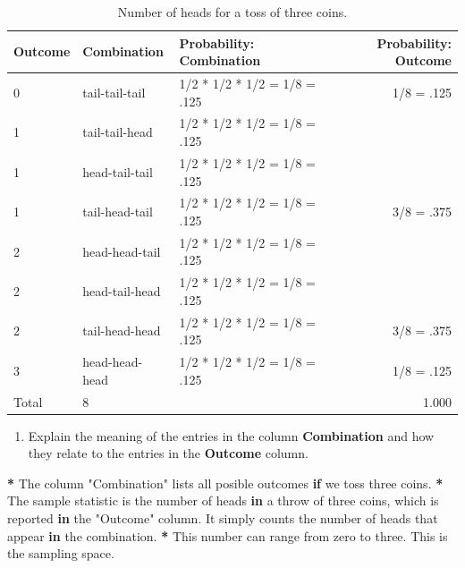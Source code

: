 \documentclass[a4paper]{book}
\newenvironment{Shaded}{\begin{snugshade}}{\end{snugshade}}
\newcommand{\StringTok}[1]{\textcolor[rgb]{0.00,0.00,0.00}{#1}}
\newcommand{\ControlFlowTok}[1]{\textcolor[rgb]{0.00,0.00,0.00}{\textbf{#1}}}
\newcommand{\OperatorTok}[1]{\textcolor[rgb]{0.00,0.00,0.00}{\textbf{#1}}}
\newcommand{\NormalTok}[1]{#1}
\providecommand{\tightlist}{%
  \setlength{\itemsep}{0pt}\setlength{\parskip}{0pt}}
\theoremstyle{definition}
\theoremstyle{definition}
\theoremstyle{definition}
\theoremstyle{remark}
\begin{document}
\begin{table}[H]

\caption{\label{tab:exact-approach}Number of heads for a toss of three coins.}
\centering
\fontsize{8}{8}\selectfont
\begin{tabular}[t]{lllr}
\hline
Outcome & Combination & Probability: Combination & Probability: Outcome\\
\hline
0 & tail-tail-tail & 1/2 * 1/2 * 1/2 = 1/8 =  .125 & 1/8 =  .125\\
1 & tail-tail-head & 1/2 * 1/2 * 1/2 = 1/8 =  .125 & \\
1 & head-tail-tail & 1/2 * 1/2 * 1/2 = 1/8 =  .125 & \\
1 & tail-head-tail & 1/2 * 1/2 * 1/2 = 1/8 =  .125 & 3/8 =  .375\\
2 & head-head-tail & 1/2 * 1/2 * 1/2 = 1/8 =  .125 & \\
2 & head-tail-head & 1/2 * 1/2 * 1/2 = 1/8 =  .125 & \\
2 & tail-head-head & 1/2 * 1/2 * 1/2 = 1/8 =  .125 & 3/8 =  .375\\
3 & head-head-head & 1/2 * 1/2 * 1/2 = 1/8 =  .125 & 1/8 =  .125\\
\hline
Total & 8 &  & 1.000\\
\hline
\end{tabular}
\end{table}

\begin{enumerate}
\def\labelenumi{\arabic{enumi}.}
\tightlist
\item
  Explain the meaning of the entries in the column \textbf{Combination}
  and how they relate to the entries in the \textbf{Outcome} column.
\end{enumerate}

\begin{Shaded}
\begin{Highlighting}[]
\OperatorTok{*}\StringTok{ }\NormalTok{The column }\StringTok{"Combination"}\NormalTok{ lists all posible outcomes }\ControlFlowTok{if}\NormalTok{ we toss three coins.}
\OperatorTok{*}\StringTok{ }\NormalTok{The sample statistic is the number of heads }\ControlFlowTok{in}\NormalTok{ a throw of three coins, which}
\NormalTok{is reported }\ControlFlowTok{in}\NormalTok{ the }\StringTok{"Outcome"}\NormalTok{ column. It simply counts the number of heads that}
\NormalTok{appear }\ControlFlowTok{in}\NormalTok{ the combination.}
\OperatorTok{*}\StringTok{ }\NormalTok{This number can range from zero to three. This is the sampling space.}
\end{Highlighting}
\end{Shaded}
\end{document}
